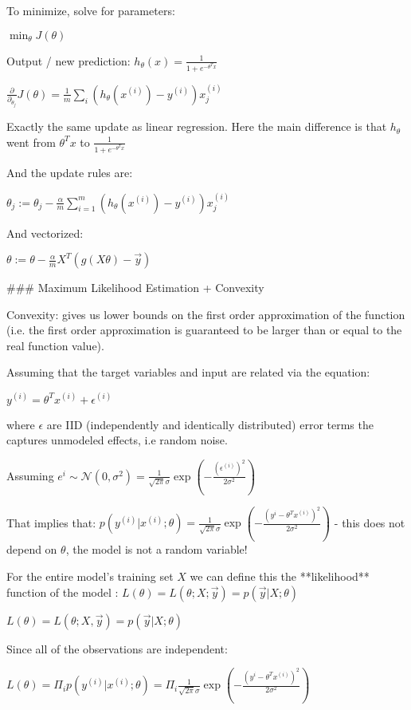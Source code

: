 To minimize, solve for parameters:

$\min_{\theta} J(\theta) $ 

Output / new prediction: $h_\theta(x) = \frac{1}{1+e^{-\theta^T x}}$

$\frac{\partial}{\partial_{\theta_j}} J(\theta) = \frac 1 m \sum_i (h_\theta(x^{(i)})-y^{(i)})x_j^{(i)}$

Exactly the same update as linear regression. Here the main difference is that $h_\theta$  went from $\theta^T x $ to $\frac{1}{1+e^{-\theta^Tx}}$

And the update rules are:

$\theta_j := \theta_j - \frac{\alpha}{m} \sum_{i=1}^m (h_\theta(x^{(i)}) - y^{(i)}) x_j^{(i)}$

And vectorized:

$\theta:=\theta - \frac{\alpha}{m}X^T(g(X\theta)-\vec{y})$

### Maximum Likelihood Estimation + Convexity

Convexity: gives us lower bounds on the first order approximation of the function (i.e. the first order approximation is guaranteed to be larger than or equal to the real function value).

Assuming that the target variables and input are related via the equation: 

$y^{(i)}=\theta^Tx^{(i)}+\epsilon^{(i)}$

where $\epsilon$ are IID (independently and identically distributed) error terms the captures unmodeled effects, i.e random noise.

Assuming $e^{i}\sim\mathcal{N}(0,\sigma^2)=\frac{1}{\sqrt{2\pi}\sigma}\exp\left(-\frac{(\epsilon^{(i)})^2}{2\sigma^2}\right)$

That implies that: $p(y^{(i)}|x^{(i)};\theta)=\frac{1}{\sqrt{2\pi}\sigma}\exp\left(-\frac{(y^{i}- \theta^Tx^{(i)})^2}{2\sigma^2}\right)$ - this does not depend on $\theta$, the model is not a random variable! 

For the entire model's training set $X$  we can define this the **likelihood** function of the model : $L(\theta)=L(\theta;X;\vec{y})=p(\vec{y}|X;\theta)$

$L(\theta) = L(\theta;X,\vec y) = p(\vec y| X;\theta)$

Since all of the observations are independent:

$L(\theta)= \Pi_{i} p(y^{(i)}| x^{(i)};\theta) = \Pi_{i} \frac{1}{\sqrt{2\pi}\sigma}\exp\left(-\frac{(y^{i}- \theta^Tx^{(i)})^2}{2\sigma^2}\right) $

